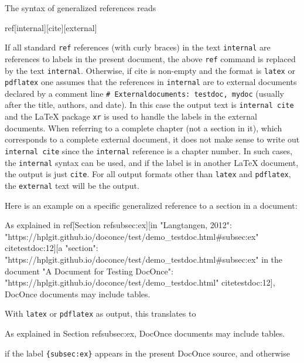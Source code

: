 \documentclass[%
oneside,                 %
final,                   %
chapterprefix=true,      %
open=right,              %
10pt]{book}
\begin{document}
The syntax of generalized references reads


\bdat
ref[internal][cite][external]

\edat

If all standard \texttt{ref} references (with curly braces)
in the text \texttt{internal} are references
to labels in the present document, the above \texttt{ref} command is replaced
by the text \texttt{internal}. Otherwise, if cite is non-empty and the format
is \texttt{latex} or \texttt{pdflatex} one assumes that the references in \texttt{internal}
are to external documents declared by a comment line \Verb!# Externaldocuments: testdoc, mydoc! (usually after the title, authors,
and date). In this case the output text is \texttt{internal cite} and the
{\LaTeX} package \texttt{xr} is used to handle the labels in the external documents.
When referring to a complete chapter (not a section in it), which
corresponds to a complete external document, it does not make sense
to write out \texttt{internal cite} since the \texttt{internal} reference is a
chapter number. In such cases, the \texttt{internal} syntax can be used,
and if the label is in another {\LaTeX} document, the output is just \texttt{cite}.
For all
output formats other than \texttt{latex} and \texttt{pdflatex}, the \texttt{external}
text will be the output.

Here is an example on a specific generalized reference to a section
in a document:









\bdat
As explained in
ref[Section ref{subsec:ex}][in "Langtangen, 2012":
"https://hplgit.github.io/doconce/test/demo_testdoc.html#subsec:ex"
cite{testdoc:12}][a "section":
"https://hplgit.github.io/doconce/test/demo_testdoc.html#subsec:ex" in
the document "A Document for Testing DocOnce":
"https://hplgit.github.io/doconce/test/demo_testdoc.html"
cite{testdoc:12}], DocOnce documents may include tables.

\edat

With \texttt{latex} or \texttt{pdflatex} as output, this translates to



\bdat
As explained in
Section ref{subsec:ex}, DocOnce documents may include tables.

\edat

if the label \Verb!{subsec:ex}! appears in the present DocOnce source, and
otherwise
\end{document}
